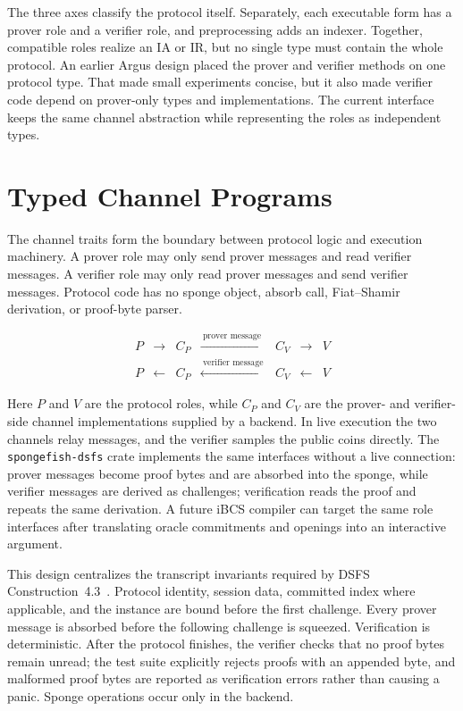 \documentclass[11pt]{article}
\begin{document}
The three axes classify the protocol itself. Separately, each executable form
has a prover role and a verifier role, and preprocessing adds an indexer.
Together, compatible roles realize an IA or IR, but no single type must contain
the whole protocol. An earlier Argus design placed the prover and verifier
methods on one protocol type. That made small experiments concise, but it also
made verifier code depend on prover-only types and implementations. The current
interface keeps the same channel abstraction while representing the roles as
independent types.

\section{Typed Channel Programs}

The channel traits form the boundary between protocol logic and execution
machinery. A prover role may only send prover messages and read verifier
messages. A verifier role may only read prover messages and send verifier
messages. Protocol code has no sponge object, absorb call, Fiat--Shamir
derivation, or proof-byte parser.

\[
\begin{array}{rclclcl}
P & \longrightarrow & C_P
  & \xrightarrow{\ \text{prover message}\ } & C_V
  & \longrightarrow & V \\
P & \longleftarrow & C_P
  & \xleftarrow{\ \text{verifier message}\ } & C_V
  & \longleftarrow & V
\end{array}
\]

Here \(P\) and \(V\) are the protocol roles, while \(C_P\) and \(C_V\) are the
prover- and verifier-side channel implementations supplied by a backend. In
live execution the two channels relay messages, and the verifier samples the
public coins directly. The \texttt{spongefish-dsfs} crate implements the same
interfaces without a live connection: prover messages become proof bytes and
are absorbed into the sponge, while verifier messages are derived as
challenges; verification reads the proof and repeats the same derivation. A
future iBCS compiler can target the same role interfaces after translating
oracle commitments and openings into an interactive argument.

This design centralizes the transcript invariants required by DSFS
Construction~4.3~\cite{dsfs}. Protocol identity, session data, committed index
where applicable, and the instance are bound before the first challenge. Every
prover message is absorbed before the following challenge is squeezed.
Verification is deterministic. After the protocol finishes, the verifier checks
that no proof bytes remain unread; the test suite explicitly rejects proofs
with an appended byte, and malformed proof bytes are reported as verification
errors rather than causing a panic. Sponge operations occur only in the backend.
\end{document}
